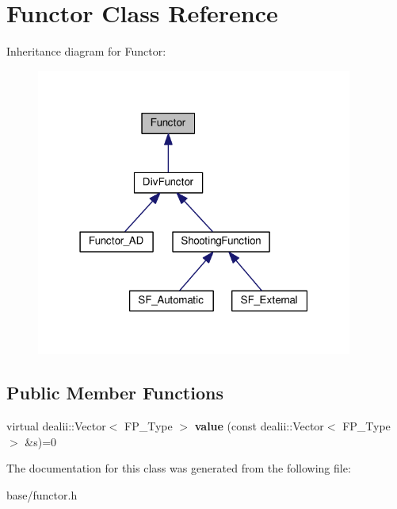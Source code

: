 \hypertarget{classFunctor}{}\section{Functor Class Reference}
\label{classFunctor}


Inheritance diagram for Functor\+:
\nopagebreak
\begin{figure}[H]
\begin{center}
\leavevmode
\includegraphics[width=295pt]{classFunctor__inherit__graph}
\end{center}
\end{figure}
\subsection*{Public Member Functions}
\begin{DoxyCompactItemize}
\item 
\mbox{\label{classFunctor_ab7e3631ca5831b055129fed93064b045}} 
virtual dealii\+::\+Vector$<$ F\+P\+\_\+\+Type $>$ {\bfseries value} (const dealii\+::\+Vector$<$ F\+P\+\_\+\+Type $>$ \&s)=0
\end{DoxyCompactItemize}


The documentation for this class was generated from the following file\+:\begin{DoxyCompactItemize}
\item 
base/functor.\+h\end{DoxyCompactItemize}

